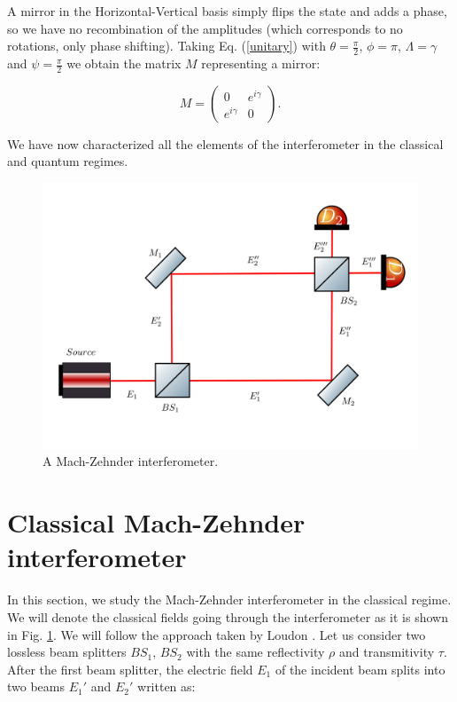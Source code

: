\documentclass[12pt]{book}
\begin{document}
 A mirror in the Horizontal-Vertical basis simply flips the state and adds a phase, so we have no recombination of the amplitudes (which corresponds to no rotations, only phase shifting). Taking Eq. (\ref{unitary}) with $\theta=\frac{\pi}{2}$, $\phi=\pi$, $\Lambda=\gamma$ and $\psi= \frac{\pi}{2} $ we obtain the matrix $M$ representing a mirror:

 
\begin{equation}
M=\begin{pmatrix} 0& e^{i\gamma}  \\ e^{i\gamma} & 0 \end{pmatrix}. \label{mirror}
\end{equation}


 We have now characterized all the elements of the interferometer in the classical and quantum regimes.

\begin{figure}[H]
\centering
\includegraphics[width=\linewidth]{images/machzenhdercla.png}
\caption{A Mach-Zehnder interferometer.}
\label{fig:classical mach}
\end{figure}



\section{Classical Mach-Zehnder interferometer}

In this section, we study the Mach-Zehnder interferometer in the classical regime. We will denote the classical fields going through the interferometer as it is shown in Fig. \ref{fig:classical mach}. We will follow the approach taken by Loudon \cite{ludon}. Let us consider two lossless beam splitters   $BS_{1}$, $BS_{2}$ with the same reflectivity $\rho$ and transmitivity $\tau$. After the first beam splitter, the electric field $E_{1}$ of the incident beam splits into two beams $E_{1}'$ and $E_{2}'$ written as:
\end{document}
